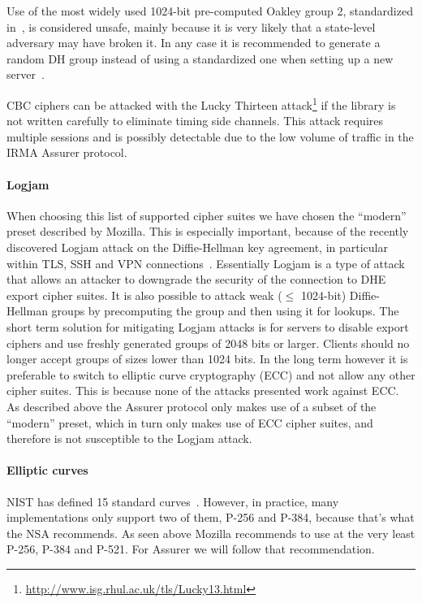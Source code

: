 Use of the most widely used 1024-bit pre-computed Oakley group 2, standardized in~\cite{ike}, is considered unsafe, mainly because it is very likely that a state-level adversary may have broken it. In any case it is recommended to generate a random DH group instead of using a standardized one when setting up a new server~\cite{logjam}.

CBC ciphers can be attacked with the Lucky Thirteen attack\footnote{\url{http://www.isg.rhul.ac.uk/tls/Lucky13.html}} if the library is not written carefully to eliminate timing side channels. This attack requires multiple sessions and is possibly detectable due to the low volume of traffic in the IRMA Assurer protocol.

\paragraph{Logjam}
When choosing this list of supported cipher suites we have chosen the ``modern'' preset described by Mozilla. This is especially important, because of the recently discovered Logjam attack on the Diffie-Hellman key agreement, in particular within TLS, SSH and VPN connections~\cite{logjam}. Essentially Logjam is a type of attack that allows an attacker to downgrade the security of the connection to DHE export cipher suites. It is also possible to attack weak ($\leq$ 1024-bit) Diffie-Hellman groups by precomputing the group and then using it for lookups. The short term solution for mitigating Logjam attacks is for servers to disable export ciphers and use freshly generated groups of 2048 bits or larger. Clients should no longer accept groups of sizes lower than 1024 bits. In the long term however it is preferable to switch to elliptic curve cryptography (ECC) and not allow any other cipher suites. This is because none of the attacks presented work against ECC. As described above the Assurer protocol only makes use of a subset of the ``modern'' preset, which in turn only makes use of ECC cipher suites, and therefore is not susceptible to the Logjam attack.

\paragraph{Elliptic curves}
NIST has defined 15 standard curves~\cite{dss}. However, in practice, many implementations only support two of them, P-256 and P-384, because that's what the NSA recommends. As seen above Mozilla recommends to use at the very least P-256, P-384 and P-521. For Assurer we will follow that recommendation.

